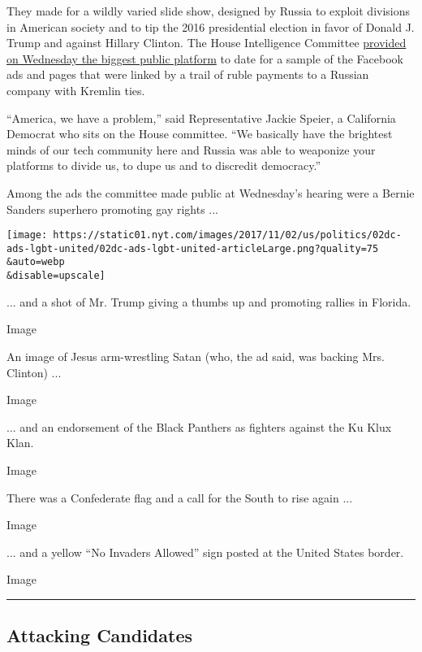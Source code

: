 They made for a wildly varied slide show, designed by Russia to exploit
divisions in American society and to tip the 2016 presidential election
in favor of Donald J. Trump and against Hillary Clinton. The House
Intelligence Committee
\href{https://www.nytimes.com/2017/11/01/us/politics/facebook-google-twitter-russian-interference-hearings.html}{provided
on Wednesday the biggest public platform} to date for a sample of the
Facebook ads and pages that were linked by a trail of ruble payments to
a Russian company with Kremlin ties.

``America, we have a problem,'' said Representative Jackie Speier, a
California Democrat who sits on the House committee. ``We basically have
the brightest minds of our tech community here and Russia was able to
weaponize your platforms to divide us, to dupe us and to discredit
democracy.''

Among the ads the committee made public at Wednesday's hearing were a
Bernie Sanders superhero promoting gay rights ...

\texttt{[image: https://static01.nyt.com/images/2017/11/02/us/politics/02dc-ads-lgbt-united/02dc-ads-lgbt-united-articleLarge.png?quality=75\\\&auto=webp\\\&disable=upscale]}

... and a shot of Mr. Trump giving a thumbs up and promoting rallies in
Florida.

Image

An image of Jesus arm-wrestling Satan (who, the ad said, was backing
Mrs. Clinton) ...

Image

... and an endorsement of the Black Panthers as fighters against the Ku
Klux Klan.

Image

There was a Confederate flag and a call for the South to rise again ...

Image

... and a yellow ``No Invaders Allowed'' sign posted at the United
States border.

Image

\begin{center}\rule{0.5\linewidth}{\linethickness}\end{center}

\hypertarget{attacking-candidates}{%
\subsection{Attacking Candidates}\label{attacking-candidates}}

